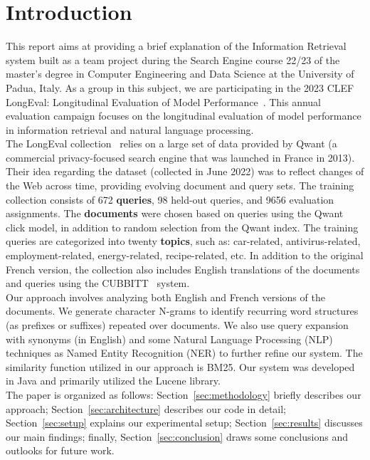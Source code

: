 \section{Introduction}\label{sec:introduction}
This report aims at providing a brief explanation of the Information Retrieval system built as a team project during the
Search Engine course 22/23 of the master's degree in Computer Engineering and Data Science at the University of Padua,
Italy.
As a group in this subject, we are participating in the 2023 CLEF LongEval: Longitudinal Evaluation of Model
Performance~\cite{LongEval}.
This annual evaluation campaign focuses on the longitudinal evaluation of model performance in information retrieval and
natural language processing.\\

The LongEval collection~\cite{traindata} relies on a large set of data provided by Qwant (a commercial privacy-focused
search engine that was launched in France in 2013).
Their idea regarding the dataset (collected in June 2022) was to reflect changes of the Web across time, providing
evolving document and query sets.
The training collection consists of 672 \textbf{queries}, 98 held-out queries, and 9656 evaluation assignments.
The \textbf{documents} were chosen based on queries using the Qwant click model, in addition to random selection from
the Qwant index.
The training queries are categorized into twenty \textbf{topics}, such as: car-related, antivirus-related,
employment-related, energy-related, recipe-related, etc.
In addition to the original French version, the collection also includes English translations of the documents and
queries using the CUBBITT~\cite{CUBBITT} system.\\

Our approach involves analyzing both English and French versions of the documents.
We generate character N-grams to identify recurring word structures (as prefixes or suffixes) repeated over documents.
We also use query expansion with synonyms (in English) and some Natural Language Processing (NLP) techniques as Named
Entity Recognition (NER) to further refine our system.
The similarity function utilized in our approach is BM25.
Our system was developed in Java and primarily utilized the Lucene library.\\

The paper is organized as follows:
Section~\ref{sec:methodology} briefly describes our approach;
Section~\ref{sec:architecture} describes our code in detail;
Section~\ref{sec:setup} explains our experimental setup;
Section~\ref{sec:results} discusses our main findings; finally,
Section~\ref{sec:conclusion} draws some conclusions and outlooks for future work.